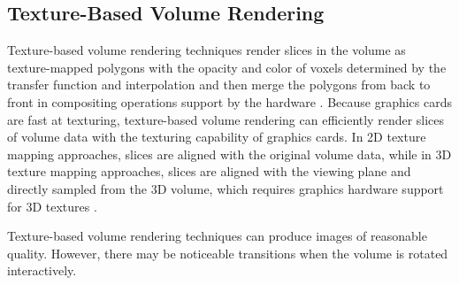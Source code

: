 \subsection{Texture-Based Volume Rendering}

Texture-based volume rendering techniques render slices in the volume as texture-mapped polygons with the opacity and color of voxels determined by the transfer function and interpolation and then merge the polygons from back to front in compositing operations support by the hardware \cite{rezk-salama_interactive_2000}.
Because graphics cards are fast at texturing, texture-based volume rendering \cite{hibbard_interactivity_1989} can efficiently render slices of volume data with the texturing capability of graphics cards.
In 2D texture mapping approaches, slices are aligned with the original volume data,
while in 3D texture mapping approaches, slices are aligned with the viewing plane and directly sampled from the 3D volume,
which requires graphics hardware support for 3D textures \cite{westermann_accelerated_2001}.

Texture-based volume rendering techniques can produce images of reasonable quality. However, there may be noticeable transitions when the volume is rotated interactively.


